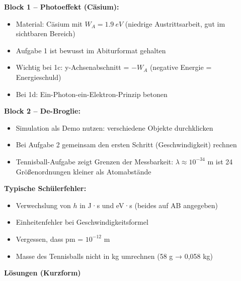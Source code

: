\documentclass[11pt,a4paper]{article}
\begin{document}
\begin{tcolorbox}[lehrerbox={Didaktische Hinweise}]
\textbf{Block 1 -- Photoeffekt (Cäsium):}
\begin{itemize}[nosep]
\item Material: Cäsium mit $W_A = \SI{1,9}{eV}$ (niedrige Austrittsarbeit, gut im sichtbaren Bereich)
\item Aufgabe 1 ist bewusst im Abiturformat gehalten
\item Wichtig bei 1c: y-Achsenabschnitt = $-W_A$ (negative Energie = Energieschuld)
\item Bei 1d: Ein-Photon-ein-Elektron-Prinzip betonen
\end{itemize}

\vspace{0.3em}
\textbf{Block 2 -- De-Broglie:}
\begin{itemize}[nosep]
\item Simulation als Demo nutzen: verschiedene Objekte durchklicken
\item Bei Aufgabe 2 gemeinsam den ersten Schritt (Geschwindigkeit) rechnen
\item Tennisball-Aufgabe zeigt Grenzen der Messbarkeit: $\lambda \approx 10^{-34}$ m ist 24 Größenordnungen kleiner als Atomabstände
\end{itemize}

\vspace{0.3em}
\textbf{Typische Schülerfehler:}
\begin{itemize}[nosep]
\item Verwechslung von $h$ in J·s und eV·s (beides auf AB angegeben)
\item Einheitenfehler bei Geschwindigkeitsformel
\item Vergessen, dass pm = $10^{-12}$ m
\item Masse des Tennisballs nicht in kg umrechnen (58 g → 0,058 kg)
\end{itemize}
\end{tcolorbox}

\vspace{0.5em}


\textbf{Lösungen (Kurzform)}

\vspace{0.3em}
\end{document}
